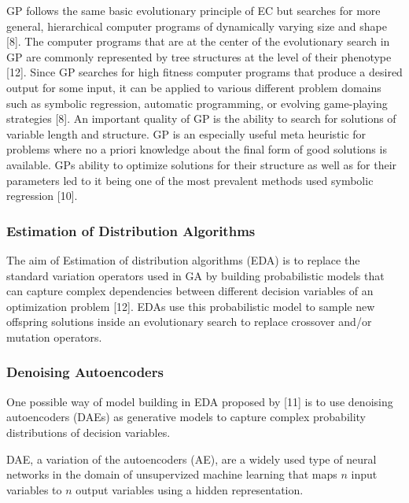 \documentclass[
  11pt,
]{article}
\begin{document}
GP follows the same basic evolutionary principle of EC but searches for more general, hierarchical computer programs of dynamically varying size and shape {[}8{]}.
The computer programs that are at the center of the evolutionary search in GP are commonly represented by tree structures at the level of their phenotype {[}12{]}.
Since GP searches for high fitness computer programs that produce a desired output for some input, it can be applied to various different problem domains such as symbolic regression, automatic programming, or evolving game-playing strategies {[}8{]}.
An important quality of GP is the ability to search for solutions of variable length and structure.
GP is an especially useful meta heuristic for problems where no a priori knowledge about the final form of good solutions is available.
GPs ability to optimize solutions for their structure as well as for their parameters led to it being one of the most prevalent methods used symbolic regression {[}10{]}.

\hypertarget{estimation-of-distribution-algorithms}{%
\subsubsection{Estimation of Distribution Algorithms}\label{estimation-of-distribution-algorithms}}

The aim of Estimation of distribution algorithms (EDA) is to replace the standard variation operators used in GA by building probabilistic models that can capture complex dependencies between different decision variables of an optimization problem {[}12{]}.
EDAs use this probabilistic model to sample new offspring solutions inside an evolutionary search to replace crossover and/or mutation operators.

\hypertarget{denoising-autoencoders}{%
\subsubsection{Denoising Autoencoders}\label{denoising-autoencoders}}

One possible way of model building in EDA proposed by {[}11{]} is to use denoising autoencoders (DAEs) as generative models to capture complex probability distributions of decision variables.

DAE, a variation of the autoencoders (AE), are a widely used type of neural networks in the domain of unsupervized machine learning that maps \(n\) input variables to \(n\) output variables using a hidden representation.
\end{document}
